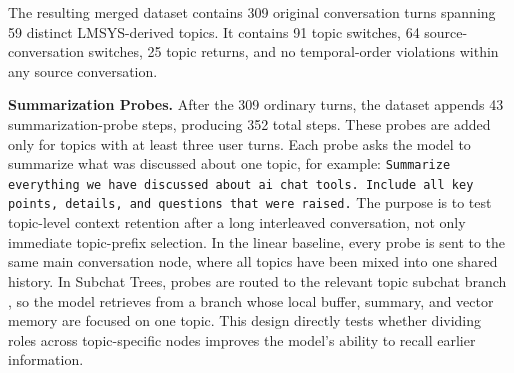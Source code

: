 The resulting merged dataset contains 309 original conversation turns spanning 59 distinct LMSYS-derived topics. It contains 91 topic switches, 64 source-conversation switches, 25 topic returns, and no temporal-order violations within any source conversation.

\textbf{Summarization Probes.}
After the 309 ordinary turns, the dataset appends 43 summarization-probe steps, producing 352 total steps. These probes are added only for topics with at least three user turns. Each probe asks the model to summarize what was discussed about one topic, for example: \texttt{Summarize everything we have discussed about ai chat tools. Include all key points, details, and questions that were raised.} The purpose is to test topic-level context retention after a long interleaved conversation, not only immediate topic-prefix selection. In the linear baseline, every probe is sent to the same main conversation node, where all topics have been mixed into one shared history. In Subchat Trees, probes are routed to the relevant topic subchat branch , so the model retrieves from a branch whose local buffer, summary, and vector memory are focused on one topic. This design directly tests whether dividing roles across topic-specific nodes improves the model's ability to recall earlier information.

